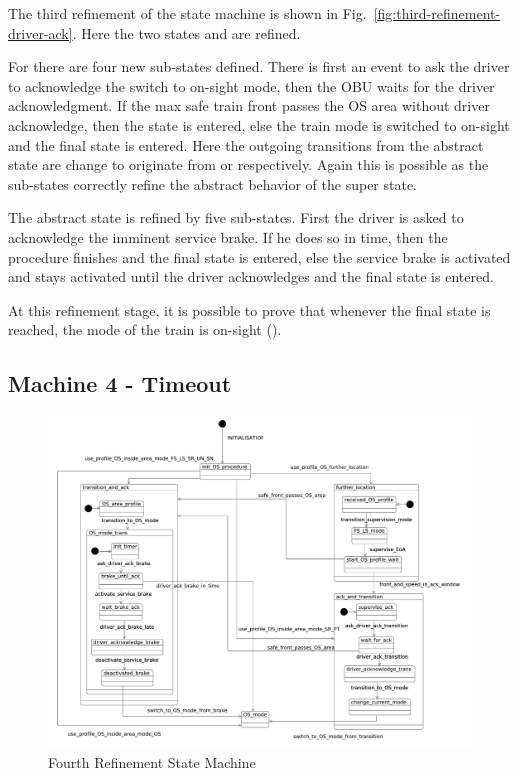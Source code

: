 \documentclass{template/openetcs_article}
\begin{document}
The third refinement of the state machine is shown in
Fig.~\ref{fig:third-refinement-driver-ack}. Here the two states
 and  are refined. 

For  there are four new sub-states defined. There is
first an event to ask the driver to acknowledge the switch to on-sight mode,
then the OBU waits for the driver acknowledgment. If the max safe train front
passes the OS area without driver acknowledge, then the
 state is entered, else the train mode is switched to
on-sight and the final state is entered. Here the outgoing transitions from the
abstract  state are change to originate from
 or  respectively. Again this
is possible as the sub-states correctly refine the abstract behavior of the
super state.

The abstract  state is refined by five sub-states. First
the driver is asked to acknowledge the imminent service brake. If he does so in
time, then the procedure finishes and the final state is entered, else the
service brake is activated and stays activated until the driver acknowledges and
the final state is entered.

At this refinement stage, it is possible to prove that whenever the final state
is reached, the mode of the train is on-sight ().

{\footnotesize

}

\subsection{Machine 4 - Timeout}
\label{sec:machine-4-timeout}


\begin{figure}[ht]
  \centering
  \includegraphics[width=.95\textwidth]{m4_timeout_on_sight_procedure}
  \caption{Fourth Refinement State Machine}
  \label{fig:fourth-refinement-state-machine}
\end{figure}

{\footnotesize

}



\end{document}
